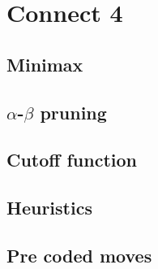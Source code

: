 \section{Connect 4}

\subsection{Minimax}

\subsection{$\alpha$-$\beta$ pruning }

\subsection{Cutoff function}

\subsection{Heuristics}

\subsection{Pre coded moves}